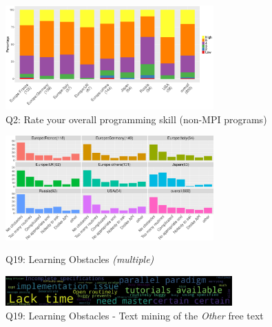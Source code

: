 \documentclass[preprint,5p,times]{elsarticle}
\def\myquote#1{{\it #1}}
\begin{document}
\begin{figure}[tb]
\begin{center}
\includegraphics[width=8.0cm]{R-scripts/Q2.pdf}
\caption{Q2: Rate your overall programming skill (non-MPI
  programs)}
\label{fig:prog-skill}
\vspace{-3mm}%
\end{center}
\end{figure}

\begin{figure}[tb]
\begin{center}
\includegraphics[width=8.0cm]{R-scripts/Q19.pdf}
\caption{Q19: Learning Obstacles {\it(multiple)}}
\label{fig:learning-obstacles}

\vspace{3mm}%

\includegraphics[width=8.7cm]{Figs/Q19-others.pdf}
\caption{Q19: Learning Obstacles - Text mining of the \myquote{Other} free
text}
\label{fig:learning-obstacles-wc}
\vspace{-3mm}%
\end{center}
\end{figure}
\end{document}
